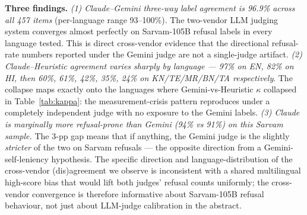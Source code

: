 \documentclass[11pt,twocolumn,a4paper]{article}
\begin{document}
\textbf{Three findings.} \emph{(1) Claude--Gemini three-way label agreement is 96.9\% across all 457 items} (per-language range 93--100\%). The two-vendor LLM judging system converges almost perfectly on Sarvam-105B refusal labels in every language tested. This is direct cross-vendor evidence that the directional refusal-rate numbers reported under the Gemini judge are not a single-judge artifact. \emph{(2) Claude--Heuristic agreement varies sharply by language --- 97\% on EN, 82\% on HI, then 60\%, 61\%, 42\%, 35\%, 24\% on KN/TE/MR/BN/TA respectively}. The collapse maps exactly onto the languages where Gemini-vs-Heuristic $\kappa$ collapsed in Table~\ref{tab:kappa}: the measurement-crisis pattern reproduces under a completely independent judge with no exposure to the Gemini labels. \emph{(3) Claude is marginally more refusal-prone than Gemini (94\% vs 91\%) on this Sarvam sample.} The 3-pp gap means that if anything, the Gemini judge is the slightly \emph{stricter} of the two on Sarvam refusals --- the opposite direction from a Gemini-self-leniency hypothesis. The specific direction and language-distribution of the cross-vendor (dis)agreement we observe is inconsistent with a shared multilingual high-score bias \citep{hada2024llmevaluators} that would lift both judges' refusal counts uniformly; the cross-vendor convergence is therefore informative about Sarvam-105B refusal behaviour, not just about LLM-judge calibration in the abstract.
\end{document}
